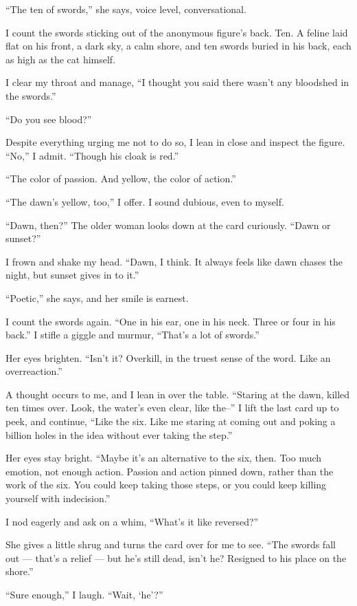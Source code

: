 ``The ten of swords,'' she says, voice level, conversational.

I count the swords sticking out of the anonymous figure's back. Ten. A
feline laid flat on his front, a dark sky, a calm shore, and ten swords
buried in his back, each as high as the cat himself.

I clear my throat and manage, ``I thought you said there wasn't any
bloodshed in the swords.''

``Do you see blood?''

Despite everything urging me not to do so, I lean in close and inspect
the figure. ``No,'' I admit. ``Though his cloak is red.''

``The color of passion. And yellow, the color of action.''

``The dawn's yellow, too,'' I offer. I sound dubious, even to myself.

``Dawn, then?'' The older woman looks down at the card curiously. ``Dawn
or sunset?''

I frown and shake my head. ``Dawn, I think. It always feels like dawn
chases the night, but sunset gives in to it.''

``Poetic,'' she says, and her smile is earnest.

I count the swords again. ``One in his ear, one in his neck. Three or
four in his back.'' I stifle a giggle and murmur, ``That's a lot of
swords.''

Her eyes brighten. ``Isn't it? Overkill, in the truest sense of the
word. Like an overreaction.''

A thought occurs to me, and I lean in over the table. ``Staring at the
dawn, killed ten times over. Look, the water's even clear, like the--''
I lift the last card up to peek, and continue, ``Like the six. Like me
staring at coming out and poking a billion holes in the idea without
ever taking the step.''

Her eyes stay bright. ``Maybe it's an alternative to the six, then. Too
much emotion, not enough action. Passion and action pinned down, rather
than the work of the six. You could keep taking those steps, or you
could keep killing yourself with indecision.''

I nod eagerly and ask on a whim, ``What's it like reversed?''

She gives a little shrug and turns the card over for me to see. ``The
swords fall out --- that's a relief --- but he's still dead, isn't he?
Resigned to his place on the shore.''

``Sure enough,'' I laugh. ``Wait, `he'?''

